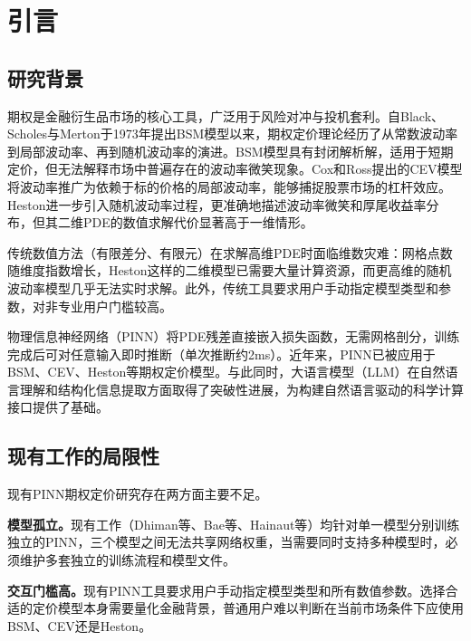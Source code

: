 \chapter{引言}\label{chap:intro}

\section{研究背景}\label{sec:background}

期权是金融衍生品市场的核心工具，广泛用于风险对冲与投机套利。自Black、Scholes与Merton于1973年提出BSM模型\cite{black1973pricing,merton1973theory}以来，期权定价理论经历了从常数波动率到局部波动率、再到随机波动率的演进。BSM模型具有封闭解析解，适用于短期定价，但无法解释市场中普遍存在的波动率微笑现象。Cox和Ross\cite{cox1976valuation}提出的CEV模型将波动率推广为依赖于标的价格的局部波动率，能够捕捉股票市场的杠杆效应。Heston\cite{heston1993closed}进一步引入随机波动率过程，更准确地描述波动率微笑和厚尾收益率分布，但其二维PDE的数值求解代价显著高于一维情形。

传统数值方法（有限差分、有限元）在求解高维PDE时面临维数灾难：网格点数随维度指数增长，Heston这样的二维模型已需要大量计算资源，而更高维的随机波动率模型几乎无法实时求解。此外，传统工具要求用户手动指定模型类型和参数，对非专业用户门槛较高。

物理信息神经网络（PINN）\cite{raissi2019physics}将PDE残差直接嵌入损失函数，无需网格剖分，训练完成后可对任意输入即时推断（单次推断约2ms）。近年来，PINN已被应用于BSM\cite{dhiman2023pinn}、CEV\cite{bae2024localvol}、Heston\cite{hainaut2024heston,guo2024icpinn}等期权定价模型。与此同时，大语言模型（LLM）在自然语言理解和结构化信息提取方面取得了突破性进展\cite{liu2025pdeagent}，为构建自然语言驱动的科学计算接口提供了基础。

\section{现有工作的局限性}\label{sec:motivation}

现有PINN期权定价研究存在两方面主要不足。

\textbf{模型孤立。}现有工作（Dhiman等\cite{dhiman2023pinn}、Bae等\cite{bae2024localvol}、Hainaut等\cite{hainaut2024heston}）均针对单一模型分别训练独立的PINN，三个模型之间无法共享网络权重，当需要同时支持多种模型时，必须维护多套独立的训练流程和模型文件。

\textbf{交互门槛高。}现有PINN工具要求用户手动指定模型类型和所有数值参数。选择合适的定价模型本身需要量化金融背景，普通用户难以判断在当前市场条件下应使用BSM、CEV还是Heston。


